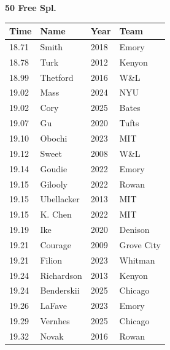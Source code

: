 \noindent\begin{minipage}[t]{0.98\textwidth}
\centering
\textbf{\textcolor{teamprimary}{50 Free Spl.}}\par
\vspace{0.5em}
\centering
\small
\renewcommand{\arraystretch}{1.0}
\setlength{\tabcolsep}{4pt}
\begin{tabular}{@{}p{2.5cm}p{4.5cm}p{1.5cm}p{2.5cm}@{}}
\toprule
\textbf{Time} & \textbf{Name} & \textbf{Year} & \textbf{Team} \\
\midrule
18.71 & Smith & 2018 & Emory \\
18.78 & Turk & 2012 & Kenyon \\
18.99 & Thetford & 2016 & W\&L \\
19.02 & Mass & 2024 & NYU \\
19.02 & Cory & 2025 & Bates \\
19.07 & Gu & 2020 & Tufts \\
19.10 & Obochi & 2023 & MIT \\
19.12 & Sweet & 2008 & W\&L \\
19.14 & Goudie & 2022 & Emory \\
19.15 & Gilooly & 2022 & Rowan \\
19.15 & Ubellacker & 2013 & MIT \\
19.15 & K. Chen & 2022 & MIT \\
19.19 & Ike & 2020 & Denison \\
19.21 & Courage & 2009 & Grove City \\
19.21 & Filion & 2023 & Whitman \\
19.24 & Richardson & 2013 & Kenyon \\
19.24 & Benderskii & 2025 & Chicago \\
19.26 & LaFave & 2023 & Emory \\
19.29 & Vernhes & 2025 & Chicago \\
19.32 & Novak & 2016 & Rowan \\
\bottomrule
\end{tabular}
\end{minipage}
\vspace{1.2em}
